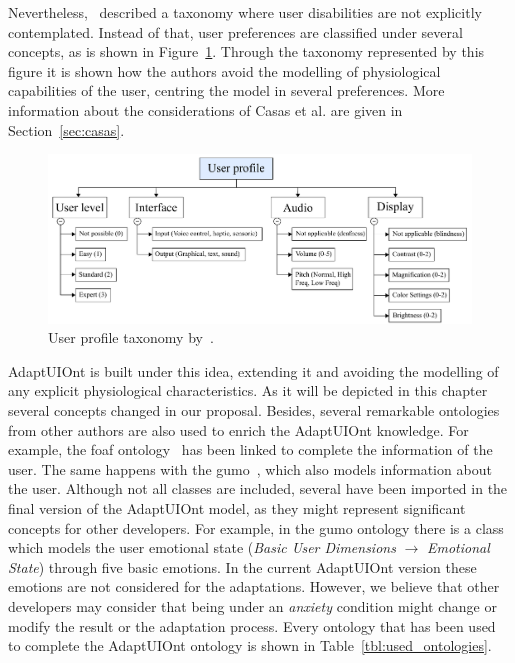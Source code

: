 Nevertheless,~\citet{casas_user_2008} described a taxonomy where user disabilities
are not explicitly contemplated. Instead of that, user preferences are classified
under several concepts, as is shown in Figure~\ref{fig:casas}. Through the taxonomy
represented by this figure it is shown how the authors avoid the modelling of
physiological capabilities of the user, centring the model in several preferences.
More information about the considerations of Casas et al. are given in
Section~\ref{sec:casas}.


\begin{figure}
\centering
\includegraphics[width=1.0\textwidth]{../figures/PDF/casas.pdf}
\caption{User profile taxonomy by~\citet{casas_user_2008}.}
\label{fig:casas}
\end{figure}

AdaptUIOnt is built under this idea, extending it and avoiding the modelling of
any explicit physiological characteristics. As it will be depicted in this chapter
several concepts changed in our proposal. Besides, several remarkable ontologies
from other authors are also used to enrich the AdaptUIOnt knowledge. For example,
the \ac{foaf} ontology~\citep{foaf} has been linked to complete the information 
of the user. The same happens with the \ac{gumo}~\citep{heckmann_gumogeneral_2005}, 
which also models information about the user. Although not all classes are 
included, several have been imported in the final version of the AdaptUIOnt 
model, as they might represent significant concepts for other developers. 
For example, in the \ac{gumo} ontology there is a class which models the user 
emotional state (\textit{Basic User Dimensions} $\rightarrow$ 
\textit{Emotional State}) through five basic emotions. In  the current AdaptUIOnt 
version these emotions are not considered for the adaptations. However, we believe
that other developers may consider that being under an \textit{anxiety} condition
might change or modify the result or the adaptation process. Every ontology that
has been used to complete the AdaptUIOnt ontology is shown in Table~\ref{tbl:used_ontologies}.

